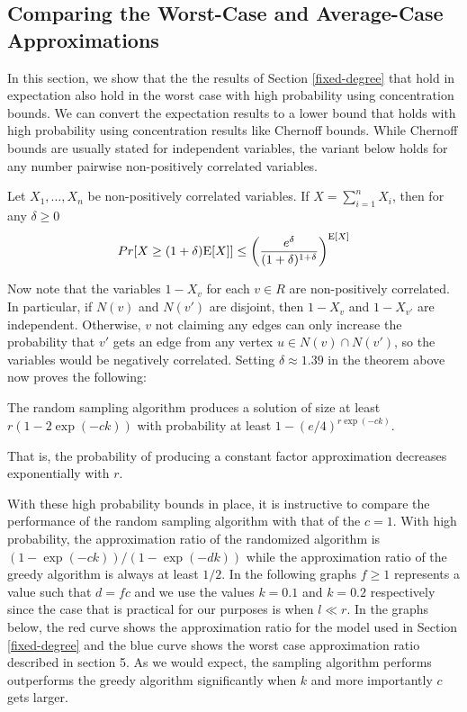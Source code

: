 \subsection{Comparing the Worst-Case and Average-Case Approximations}
In this section, we show that the the results of Section
\ref{fixed-degree} that hold in expectation also hold in the worst
case with high probability using concentration bounds. We can convert 
the expectation results to a lower bound that holds with high
probability using concentration results like Chernoff bounds. While
Chernoff bounds are usually stated for independent variables, the 
variant below holds for any number pairwise non-positively correlated
variables.

\begin{thm}
Let $X_1,\ldots, X_n$ be non-positively correlated variables. If $X=\sum_{i=1}^n X_i$, then for any $\delta\geq 0$
\[ Pr[X \geq (1+\delta)\text{E}[X] ] \leq \left(\frac{e^\delta}{(1+\delta)^{1+\delta}}\right)^{\text{E}[X]} \]
\end{thm}

Now note that the variables $1-X_v$ for each $v\in R$ are
non-positively correlated. In particular, if $N(v)$ and $N(v')$ are
disjoint, then $1-X_v$ and $1-X_{v'}$ are independent. Otherwise, $v$
not claiming any edges can only increase the probability that $v'$
gets an edge from any vertex $u\in N(v)\cap N(v')$, so the variables
would be negatively correlated. Setting $\delta\approx 1.39$ in the
theorem above now proves the following:

\begin{thm}
The random sampling algorithm produces a solution of size at least $r(1-2\exp(-ck))$ with probability at least $1-(e/4)^{r\exp(-ck)}$.
\end{thm}

That is, the probability of producing a constant factor approximation decreases exponentially with $r$.

With these high probability bounds in place, it is instructive to
compare the performance of the random sampling algorithm with that of
the $c=1$. With high probability, the approximation ratio of the
randomized algorithm is $(1-\exp(-ck))/(1-\exp(-dk))$ while the
approximation ratio of the greedy algorithm is always at least
$1/2$. In the following graphs $f\geq 1$ represents a value such that
$d=fc$ and we use the values $k=0.1$ and $k=0.2$ respectively since
the case that is practical for our purposes is when $l \ll r$. In the
graphs below, the red curve shows the approximation ratio for the
model used in Section \ref{fixed-degree} and the blue curve shows the
worst case approximation ratio described in section 5. As we would
expect, the sampling algorithm performs outperforms the greedy
algorithm significantly when $k$ and more importantly $c$ gets larger.

